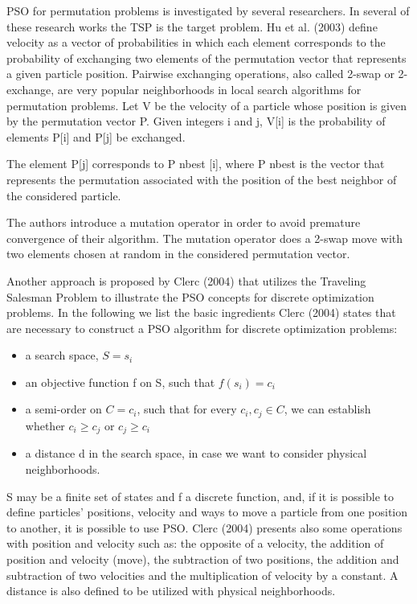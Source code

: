 PSO for permutation problems is investigated by several researchers. In several of these research works the TSP is the target problem.
Hu et al. (2003) define velocity as a vector of probabilities in which each element corresponds to the probability of exchanging two elements of the permutation vector that represents a given particle position. Pairwise exchanging operations, also called 2-swap or 2-exchange, are very popular neighborhoods in local search algorithms for permutation problems. Let V be the velocity of a particle whose position is given by the permutation vector P. Given integers i and j, V[i] is the probability of elements P[i] and P[j] be exchanged. 

The element P[j] corresponds to P nbest [i], where P nbest is the vector that represents the permutation associated with the position of the best neighbor of the considered particle.

The authors introduce a mutation operator in order to avoid premature convergence of their algorithm. The mutation operator does a 2-swap move with two elements chosen at random in the considered permutation vector.

Another approach is proposed by Clerc (2004) that utilizes the Traveling Salesman Problem to illustrate the PSO concepts for discrete optimization problems. In the following we list the basic ingredients Clerc (2004) states that are necessary to construct a PSO algorithm for
discrete optimization problems:

\begin{itemize}
\item a search space, $S = { s_i }$
\item an objective function f on S, such that $f(s_i) = c_i$
\item a semi-order on $C = {c_i }$, such that for every $c_i , c_j ∈ C$, we can establish whether $c_i ≥ c_j$ or $c_j ≥ c_i$
\item a distance d in the search space, in case we want to consider physical neighborhoods.
\end{itemize}

S may be a finite set of states and f a discrete function, and, if it is possible to define particles’ positions, velocity and ways to move a particle from one position to another, it is
possible to use PSO. Clerc (2004) presents also some operations with position and velocity such as: the opposite of a velocity, the addition of position and velocity (move), the subtraction of two positions, the addition and subtraction of two velocities and the multiplication of velocity by a constant. A distance is also defined to be utilized with
physical neighborhoods.

